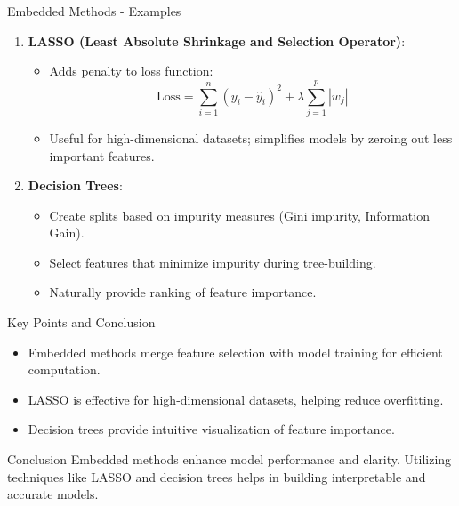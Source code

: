\documentclass[aspectratio=169]{beamer}
\begin{document}
\begin{frame}[fragile]{Embedded Methods - Examples}
    \begin{enumerate}
        \item \textbf{LASSO (Least Absolute Shrinkage and Selection Operator)}:
            \begin{itemize}
                \item Adds penalty to loss function:
                \begin{equation}
                \text{Loss} = \sum_{i=1}^{n} (y_i - \hat{y}_i)^2 + \lambda \sum_{j=1}^{p} |w_j|
                \end{equation}
                \item Useful for high-dimensional datasets; simplifies models by zeroing out less important features.
            \end{itemize}
        
        \item \textbf{Decision Trees}:
            \begin{itemize}
                \item Create splits based on impurity measures (Gini impurity, Information Gain).
                \item Select features that minimize impurity during tree-building.
                \item Naturally provide ranking of feature importance.
            \end{itemize}
    \end{enumerate}
\end{frame}

\begin{frame}[fragile]{Key Points and Conclusion}
    \begin{itemize}
        \item Embedded methods merge feature selection with model training for efficient computation.
        \item LASSO is effective for high-dimensional datasets, helping reduce overfitting.
        \item Decision trees provide intuitive visualization of feature importance.
    \end{itemize}

    \begin{block}{Conclusion}
        Embedded methods enhance model performance and clarity. Utilizing techniques like LASSO and decision trees helps in building interpretable and accurate models.
    \end{block}
\end{frame}
\end{document}
